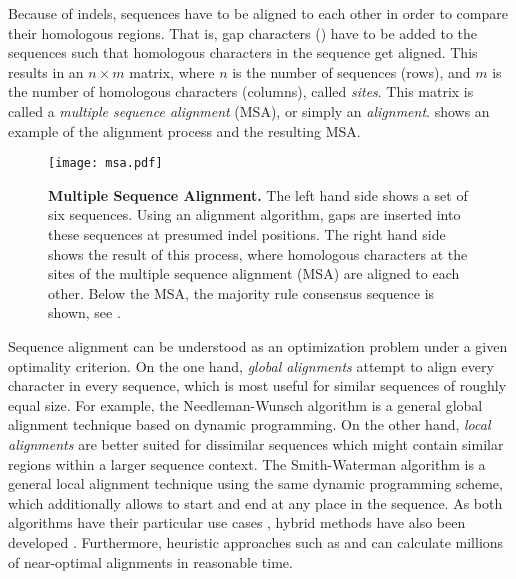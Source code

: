 Because of indels, sequences have to be aligned to each other in order to compare their homologous regions.
That is, gap characters (\nucleobase{-}) have to be added to the sequences
such that homologous characters in the sequence get aligned.
This results in an $n \times m$ matrix,
where $n$ is the number of sequences (rows),
and $m$ is the number of homologous characters (columns), called \emph{sites}.
This matrix is called a \emph{multiple sequence alignment} (MSA), or simply an \emph{alignment}.
 shows an example of the alignment process and the resulting MSA.

\begin{figure}[hpbt]
    \centering
    \texttt{[image: msa.pdf]}
    \caption[Multiple Sequence Alignment]{
        \textbf{Multiple Sequence Alignment.}
        The left hand side shows a set of six sequences.
        Using an alignment algorithm, gaps are inserted into these sequences at presumed indel positions.
        The right hand side shows the result of this process,
        where homologous characters at the sites of the multiple sequence alignment (MSA) are aligned to each other.
        Below the MSA, the majority rule consensus sequence is shown,
        see .
    }
    \label{fig:msa}
\end{figure}

Sequence alignment can be understood as an optimization problem under a given optimality criterion.
On the one hand, \emph{global alignments} attempt to align every character in every sequence,
which is most useful for similar sequences of roughly equal size.
For example, the Needleman-Wunsch algorithm \cite{Needleman1970} is a general global alignment technique
based on dynamic programming.
On the other hand, \emph{local alignments} are better suited for dissimilar sequences
which might contain similar regions within a larger sequence context.
The Smith-Waterman algorithm \cite{Smith1981} is a general local alignment technique
using the same dynamic programming scheme,
which additionally allows to start and end at any place in the sequence.
As both algorithms have their particular use cases \cite{Polyanovsky2011},
hybrid methods have also been developed \cite{Brudno2003}.
Furthermore, heuristic approaches such as  \cite{Altschul1990} and
 \cite{Edgar2010} can calculate millions of near-optimal alignments in reasonable time.

